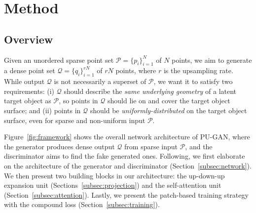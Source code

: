 \section{Method}
\label{sec:method}

\subsection{Overview}
\label{subsec:overview}
Given an unordered sparse point set $\mathcal{P}=\{p_i\}_{i=1}^N$ of $N$ points, we aim to generate a dense point set $\mathcal{Q}=\{q_i\}_{i=1}^{rN}$ of $rN$ points, where $r$ is the upsampling rate.
While output $\mathcal{Q}$ is not necessarily a superset of $\mathcal{P}$, we want it to satisfy two requirements:
(i) $\mathcal{Q}$ should describe the {\em same underlying geometry\/} of a latent target object as $\mathcal{P}$, so points in $\mathcal{Q}$ should lie on and cover the target object surface; and
(ii) points in $\mathcal{Q}$ should be {\em uniformly-distributed\/} on the target object surface, even for sparse and non-uniform input $\mathcal{P}$.

%
Figure~\ref{fig:framework} shows the overall network architecture of PU-GAN, where the generator produces dense output $\mathcal{Q}$ from sparse input $\mathcal{P}$,
and the discriminator aims to find the fake generated ones.
Following, we first elaborate on the architecture of the generator and discriminator (Section~\ref{subsec:network}).
We then present two building blocks in our architecture: the up-down-up expansion unit (Sections~\ref{subsec:projection}) and the self-attention unit (Section~\ref{subsec:attention}).
Lastly, we present the patch-based training strategy with the compound loss (Section~\ref{subsec:training}).



